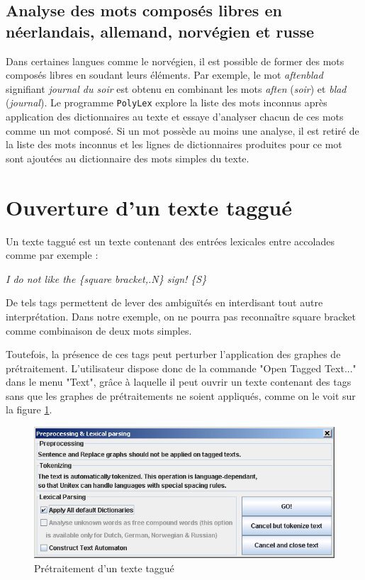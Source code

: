 \subsection{Analyse des mots composés libres en néerlandais, allemand, norvégien et russe}

\label{section-Norwegian-compound-words}
Dans certaines langues comme le norvégien, il est possible de former des mots composés
libres en soudant leurs éléments. Par exemple, le mot \textit{aftenblad} signifiant \textit{journal
du soir} est obtenu en combinant les mots \textit{aften} (\textit{soir}) et \textit{blad}
(\textit{journal}). Le programme \verb+PolyLex+  explore la liste des mots inconnus après application des dictionnaires au
texte et essaye d’analyser chacun de ces mots comme un mot composé. Si un mot possède au moins une
analyse, il est retiré de la liste des mots inconnus et les lignes de dictionnaires produites pour
ce mot sont ajoutées au dictionnaire des mots simples du texte.

\section{Ouverture d’un texte taggué}
Un texte taggué est un texte contenant des entrées lexicales entre accolades comme par
exemple :


\bigskip
\textit{I do not like the \{square bracket,.N\} sign! \{S\}}

\bigskip
\noindent De tels tags permettent de lever des ambiguïtés en interdisant tout autre interprétation.
Dans notre exemple, on ne pourra pas reconnaître square bracket comme combinaison de deux mots
simples.


\bigskip
\noindent Toutefois, la présence de ces tags peut perturber l’application des graphes de
prétraitement. L’utilisateur dispose donc de la commande "Open Tagged Text..." dans le menu "Text",
grâce à laquelle il peut ouvrir un texte contenant des tags sans que les graphes de prétraitements
ne soient appliqués, comme on le voit sur la figure \ref{preprocess-tagged-text}.

\bigskip
\begin{figure}[!ht]
\begin{center}
\includegraphics[width=14cm]{resources/img/fig2-15.png}
\caption{Prétraitement d’un texte taggué\label{preprocess-tagged-text}}
\end{center}
\end{figure}

